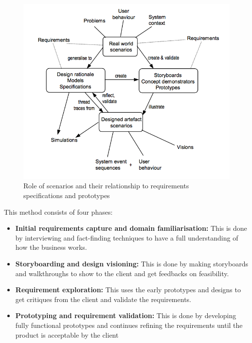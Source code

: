 \begin{figure}[htb]
\centering
\includegraphics[scale=0.7]{fig/REscenario.png}
  \caption{Role of scenarios and their relationship to requirements specifications and prototypes}
\label{fig:REscenario}
\end{figure}


This method consists of four phases:
\begin{itemize}

\item \textbf{Initial requirements capture and domain familiarisation: } This is done by interviewing and fact-finding techniques to have a full understanding of how the business works.

\item \textbf{Storyboarding and design visioning: } This is done by making storyboards and walkthroughs to show to the client and get feedbacks on feasibility.

\item \textbf{Requirement exploration: } This uses the early prototypes  and designs to get critiques from the client and validate the requirements.

\item \textbf{Prototyping and requirement validation: } This is done by developing fully functional prototypes and continues refining the requirements until the product is acceptable by the client

\end{itemize}

